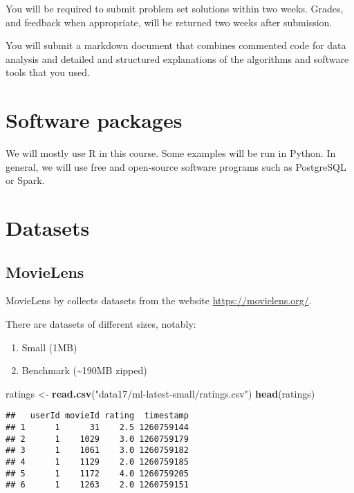 \documentclass[]{book}
\newenvironment{Shaded}{\begin{snugshade}}{\end{snugshade}}
\newcommand{\KeywordTok}[1]{\textcolor[rgb]{0.13,0.29,0.53}{\textbf{{#1}}}}
\newcommand{\StringTok}[1]{\textcolor[rgb]{0.31,0.60,0.02}{{#1}}}
\newcommand{\NormalTok}[1]{{#1}}
\providecommand{\tightlist}{%
  \setlength{\itemsep}{0pt}\setlength{\parskip}{0pt}}
\theoremstyle{definition}
\theoremstyle{definition}
\theoremstyle{definition}
\theoremstyle{remark}
\begin{document}
You will be required to submit problem set solutions within two weeks.
Grades, and feedback when appropriate, will be returned two weeks after
submission.

You will submit a markdown document that combines commented code for
data analysis and detailed and structured explanations of the algorithms
and software tools that you used.

\section{Software packages}\label{software-packages}

We will mostly use R in this course. Some examples will be run in
Python. In general, we will use free and open-source software programs
such as PostgreSQL or Spark.

\section{Datasets}\label{datasets}

\subsection{MovieLens}\label{movielens}

MovieLens by
\citet[\url{https://grouplens.org/datasets/movielens/}]{Harper2015}
collects datasets from the website \url{https://movielens.org/}.

There are datasets of different sizes, notably:

\begin{enumerate}
\def\labelenumi{\arabic{enumi}.}
\tightlist
\item
  Small (1MB)
\item
  Benchmark (\textasciitilde{}190MB zipped)
\end{enumerate}

\begin{Shaded}
\begin{Highlighting}[]
\NormalTok{ratings <-}\StringTok{ }\KeywordTok{read.csv}\NormalTok{(}\StringTok{"data17/ml-latest-small/ratings.csv"}\NormalTok{)}
\KeywordTok{head}\NormalTok{(ratings)}
\end{Highlighting}
\end{Shaded}

\begin{verbatim}
##   userId movieId rating  timestamp
## 1      1      31    2.5 1260759144
## 2      1    1029    3.0 1260759179
## 3      1    1061    3.0 1260759182
## 4      1    1129    2.0 1260759185
## 5      1    1172    4.0 1260759205
## 6      1    1263    2.0 1260759151
\end{verbatim}
\end{document}
